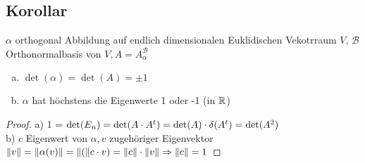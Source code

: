 \subsection{Korollar}
$\alpha$ orthogonal Abbildung auf endlich dimensionalen Euklidischen Vekotrraum $V,\, \mathcal{B}$ Orthonormalbasis von $V, A = A^\mathcal{B}_\alpha$
\begin{enumerate}[a)]
\item $\det(\alpha) = \det(A) = \pm 1$
\item $\alpha$ hat höchstens die Eigenwerte 1 oder -1 (in $\mathbb{R}$)
\end{enumerate}
\begin{proof}
a) 1 = $\det(E_n) = \det(A \cdot A^t) = \det(A) \cdot \delta(A^t) = \det(A^2)$\\
b) $c$ Eigenwert von $\alpha, v$ zugehöriger Eigenvektor\\
$\Vert v\Vert = \Vert\alpha(v)\Vert = \Vert(\Vert c \cdot v) = \Vert c\Vert \cdot \Vert v\Vert \Rightarrow \Vert c\Vert = 1$
\end{proof}
